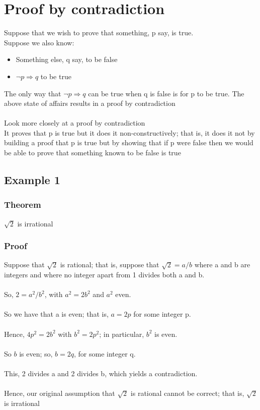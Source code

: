 \documentclass{article}[18pt]
\begin{document}
\section{Proof by contradiction}
Suppose that we wish to prove that something, p say, is true.\\
Suppose we also know:
\begin{itemize}
	\item Something else, q say, to be false
	\item $\lnot p\Rightarrow q$ to be true
\end{itemize}
The only way that $\lnot p\Rightarrow q$ can be true when q is false is for p to be true. The above state of affairs results in a proof by contradiction\\
\\
Look more closely at a proof by contradiction\\
It proves that p is true but it does it non-constructively; that is, it does it not by building a proof that p is true but by showing that if p were false then we would be able to prove that something known to be false is true
\subsection{Example 1}
\subsubsection{Theorem}
$\sqrt{2}$ is irrational
\subsubsection{Proof}
Suppose that $\sqrt{2}$ is rational; that is, suppose that $\sqrt{2}=a/b$ where a and b are integers and where no integer apart from 1 divides both a and b.\\
\\
So, $2=a^2/b^2$, with $a^2=2b^2$ and $a^2$ even.\\
\\
So we have that a is even; that is, $a=2p$ for some integer p.\\
\\
Hence, $4p^2=2b^2$ with $b^2=2p^2$; in particular, $b^2$ is even.\\
\\
So $b$ is even; so, $b=2q$, for some integer q.\\
\\
This, 2 divides a and 2 divides b, which yields a contradiction.\\
\\
Hence, our original assumption that $\sqrt{2}$ is rational cannot be correct; that is, $\sqrt{2}$ is irrational
\end{document}
